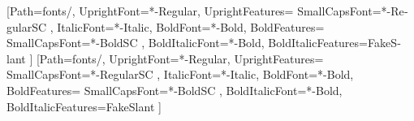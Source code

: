 

\usepackage{amsmath}
\usepackage{unicode-math}
\setmainfont{Meta}[Path={fonts/},
	UprightFont=*-Regular,
	UprightFeatures={
		SmallCapsFont={*-RegularSC}
	},
	ItalicFont=*-Italic,
	BoldFont=*-Bold,
	BoldFeatures={
		SmallCapsFont={*-BoldSC}
	},
	BoldItalicFont=*-Bold,
	BoldItalicFeatures={FakeSlant}
]
\setsansfont{Meta}[Path={fonts/},
	UprightFont=*-Regular,
	UprightFeatures={
		SmallCapsFont={*-RegularSC}
	},
	ItalicFont=*-Italic,
	BoldFont=*-Bold,
	BoldFeatures={
		SmallCapsFont={*-BoldSC}
	},
	BoldItalicFont=*-Bold,
	BoldItalicFeatures={FakeSlant}
]
\usepackage{polyglossia}
\setmainlanguage{german}

\usepackage[pantone312]{wwustyle}
\usepackage{csquotes}
\usepackage{microtype}
\usepackage{graphicx}
\usepackage{datetime}
\usepackage{multirow}
\usepackage{siunitx}

\hypersetup{unicode}

\renewcommand{\textrightarrow}{$\rightarrow$}
\newcommand{\email}[1]{\href{mailto:#1}{\texttt{#1}}}



